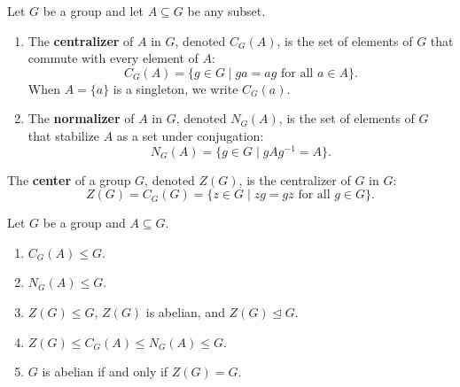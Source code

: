\begin{definition}
Let $G$ be a group and let $A \subseteq G$ be any subset.
\begin{enumerate}[label=\textbf{(\arabic*)}, leftmargin=*, itemsep=4pt]
    \item The \textbf{centralizer} of $A$ in $G$, denoted $C_G(A)$, is the set of elements of $G$ that commute with every element of $A$:
    \begin{equation}
    C_G(A) = \{ g \in G \mid ga = ag \text{ for all } a \in A \}.
    \end{equation}
    When $A = \{a\}$ is a singleton, we write $C_G(a)$.
    \item The \textbf{normalizer} of $A$ in $G$, denoted $N_G(A)$, is the set of elements of $G$ that stabilize $A$ as a set under conjugation:
    \begin{equation}
    N_G(A) = \{ g \in G \mid gAg^{-1} = A \}.
    \end{equation}
\end{enumerate}
\end{definition}

\begin{definition}
The \textbf{center} of a group $G$, denoted $Z(G)$, is the centralizer of $G$ in $G$:
\begin{equation}
Z(G) = C_G(G) = \{ z \in G \mid zg = gz \text{ for all } g \in G \}.
\end{equation}
\end{definition}

\begin{proposition}
\label{prop:cent_norm_props}
Let $G$ be a group and $A \subseteq G$.
\begin{enumerate}[label=\textbf{(\roman*)}, leftmargin=*, itemsep=4pt]
    \item $C_G(A) \le G$.
    \item $N_G(A) \le G$.
    \item $Z(G) \le G$, $Z(G)$ is abelian, and $Z(G) \trianglelefteq G$.
    \item $Z(G) \le C_G(A) \le N_G(A) \le G$.
    \item $G$ is abelian if and only if $Z(G) = G$.
\end{enumerate}
\end{proposition}

